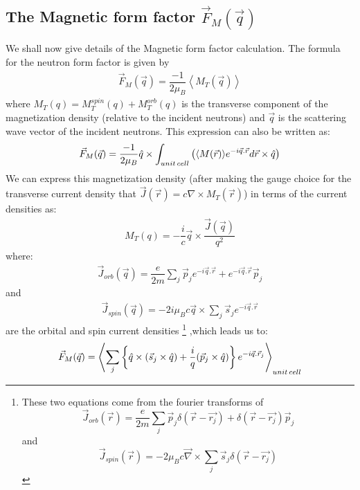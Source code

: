 \documentclass[10pt]{ruthesis}
\begin{document}
{\subsection{The Magnetic form factor $\vec{F}_{M}(\vec{q})$}
We shall now give details of the Magnetic form factor calculation. The formula for the neutron form factor is given by 
\begin{align}
\vec{F}_{M}(\vec{q})=\dfrac{-1}{2\mu_{B}} \left \langle M_{T}(\vec{q}) \right \rangle
\end{align}
where $M_{T}(q)=M_{T}^{spin}(q)+M_{T}^{orb}(q)$ is the transverse component of the magnetization density (relative to the incident neutrons)  and $\vec{q}$ is the scattering wave vector of the incident neutrons. This expression  can also be written as:
\begin{align}
\vec{F}_{M}(\vec q)=\dfrac{-1}{2\mu_{B}} \hat{q} \times \int_{unit \hspace{0.5mm} cell} \left(\langle M(\vec{r})\rangle e^{-i\vec{q}.\vec{r}} d \vec{r} \times \hat{q} \right)
\end{align}
 We can express this magnetization density (after making the gauge choice for the transverse current density that $\vec{J}(\vec{r})=c \nabla \times M_T(\vec{r})$) in terms of the current densities as:
 \begin{align}
 M_{T}(q)=-\dfrac{i}{c}\vec{q} \times \dfrac{\vec{J}(\vec{q})}{q^{2}}
 \end{align}
where:
\begin{align}
\vec{J}_{orb}(\vec{q})=\dfrac{e}{2m}\sum_{j} \vec p_{j}e^{-i \vec{q}.\vec{r}} + e^{-i\vec{q}.\vec{r}} \vec{p}_{j}
\end{align}
and 
\begin{align}
\vec{J}_{spin}(\vec{q})=-2i \mu_{B} c \vec{q} \times \sum_{j} \vec{s}_{j}e^{-i \vec{q}.\vec{r}}
\end{align}
 are the orbital and spin current densities \footnote{ These two equations come from the fourier transforms of
\begin{equation}
 \vec{J}_{orb}(\vec r)= \dfrac{e}{2m} \sum_j \vec{p}_{j} \delta (\vec{r}-\vec{r_j}) + \delta (\vec{r}-\vec{r_j}) \vec{p}_{j}
 \end{equation} 
 and 
 \begin{equation}
 \vec{J}_{spin}(\vec r)= -2\mu_B c \vec{\nabla} \times \sum_j \vec{s}_{j} \delta (\vec{r}-\vec{r_j}) 
 \end{equation} 
  }
 ,which leads us to:
\begin{align} \label{Fm1}
\vec{F}_{M}(\vec q)= \left \langle \sum_{j} \left \lbrace \hat{q} \times (\vec{s}_{j} \times \hat{q}) + \dfrac{i}{q}(\vec{p}_{j} \times \hat{q}) \right \rbrace e^{-i \vec{q} .\vec{r}_{j}} \right \rangle _{ unit \hspace{0.5mm} cell}
\end{align} 

}
\end{document}
